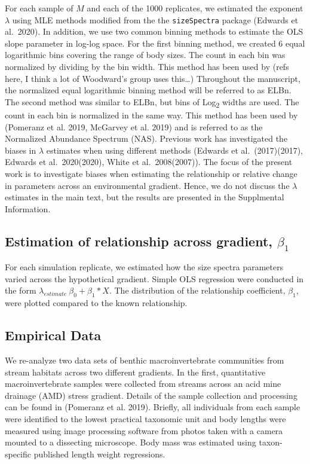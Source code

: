 \documentclass[
]{article}
\begin{document}
For each sample of \(M\) and each of the 1000 replicates, we estimated
the exponent \(\lambda\) using MLE methods modified from the the
\texttt{sizeSpectra} package (Edwards et al.~2020). In addition, we use
two common binning methods to estimate the OLS slope parameter in
log-log space. For the first binning method, we created 6 equal
logarithmic bins covering the range of body sizes. The count in each bin
was normalized by dividing by the bin width. This method has been used
by (refs here, I think a lot of Woodward's group uses this\ldots)
Throughout the manuscript, the normalized equal logarithmic binning
method will be referred to as ELBn. The second method was similar to
ELBn, but bins of Log\textsubscript{2} widths are used. The count in
each bin is normalized in the same way. This method has been used by
(Pomeranz et al. 2019, McGarvey et al. 2019) and is referred to as the
Normalized Abundance Spectrum (NAS). Previous work has investigated the
biases in \(\lambda\) estimates when using different methods (Edwards et
al.~(2017)(2017), Edwards et al.~2020(2020), White et al.~2008(2007)).
The focus of the present work is to investigate biases when estimating
the relationship or relative change in parameters across an
environmental gradient. Hence, we do not discuss the \(\lambda\)
estimates in the main text, but the results are presented in the
Supplmental Information.

\hypertarget{estimation-of-relationship-across-gradient-beta_1}{%
\subsection{\texorpdfstring{Estimation of relationship across gradient,
\(\beta_1\)}{Estimation of relationship across gradient, \textbackslash beta\_1}}\label{estimation-of-relationship-across-gradient-beta_1}}

For each simulation replicate, we estimated how the size spectra
parameters varied across the hypothetical gradient. Simple OLS
regression were conducted in the form
\(\lambda_{estimate} ~ \beta_0 + \beta_1 * X\). The distribution of the
relationship coefficient, \(\beta_1\), were plotted compared to the
known relationship.

\hypertarget{empirical-data}{%
\subsection{Empirical Data}\label{empirical-data}}

We re-analyze two data sets of benthic macroinvertebrate communities
from stream habitats across two different gradients. In the first,
quantitative macroinvertebrate samples were collected from streams
across an acid mine drainage (AMD) stress gradient. Details of the
sample collection and processing can be found in (Pomeranz et al. 2019).
Briefly, all individuals from each sample were identified to the lowest
practical taxonomic unit and body lengths were measured using image
processing software from photos taken with a camera mounted to a
dissecting microscope. Body mass was estimated using taxon-specific
published length weight regressions.
\end{document}
